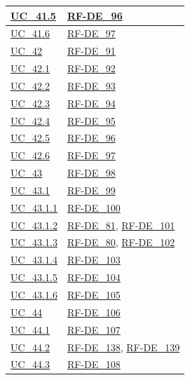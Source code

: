 \begin{longtable}{|
        >{\raggedright\arraybackslash}p{} |
        >{\raggedright\arraybackslash}p{} |
    }
    \hline
    \hyperref[uc_41.5]{UC\_41.5} & \hyperlink{rf-de_96}{RF-DE\_96} \\
    \hline
    \hyperref[uc_41.6]{UC\_41.6} & \hyperlink{rf-de_97}{RF-DE\_97} \\
    \hline
    \hyperref[uc_42]{UC\_42} & \hyperlink{rf-de_91}{RF-DE\_91} \\
    \hline
    \hyperref[uc_42.1]{UC\_42.1} & \hyperlink{rf-de_92}{RF-DE\_92} \\
    \hline
    \hyperref[uc_42.2]{UC\_42.2} & \hyperlink{rf-de_93}{RF-DE\_93} \\
    \hline
    \hyperref[uc_42.3]{UC\_42.3} & \hyperlink{rf-de_94}{RF-DE\_94} \\
    \hline
    \hyperref[uc_42.4]{UC\_42.4} & \hyperlink{rf-de_95}{RF-DE\_95} \\
    \hline
    \hyperref[uc_42.5]{UC\_42.5} & \hyperlink{rf-de_96}{RF-DE\_96} \\
    \hline
    \hyperref[uc_42.6]{UC\_42.6} & \hyperlink{rf-de_97}{RF-DE\_97} \\
    \hline
    \hyperref[uc_43]{UC\_43} & \hyperlink{rf-de_98}{RF-DE\_98} \\
    \hline
    \hyperref[uc_43.1]{UC\_43.1} & \hyperlink{rf-de_99}{RF-DE\_99} \\
    \hline
    \hyperref[uc_43.1.1]{UC\_43.1.1} & \hyperlink{rf-de_100}{RF-DE\_100} \\
    \hline
    \hyperref[uc_43.1.2]{UC\_43.1.2} & \hyperlink{rf-de_81}{RF-DE\_81}, \hyperlink{rf-de_101}{RF-DE\_101} \\
    \hline
    \hyperref[uc_43.1.3]{UC\_43.1.3} & \hyperlink{rf-de_80}{RF-DE\_80}, \hyperlink{rf-de_102}{RF-DE\_102} \\
    \hline
    \hyperref[uc_43.1.4]{UC\_43.1.4} & \hyperlink{rf-de_103}{RF-DE\_103} \\
    \hline
    \hyperref[uc_43.1.5]{UC\_43.1.5} & \hyperlink{rf-de_104}{RF-DE\_104} \\
    \hline
    \hyperref[uc_43.1.6]{UC\_43.1.6} & \hyperlink{rf-de_105}{RF-DE\_105} \\
    \hline
    \hyperref[uc_44]{UC\_44} & \hyperlink{rf-de_106}{RF-DE\_106} \\
    \hline
    \hyperref[uc_44.1]{UC\_44.1} & \hyperlink{rf-de_107}{RF-DE\_107} \\
    \hline
    \hyperref[uc_44.2]{UC\_44.2} & \hyperlink{rf-de_138}{RF-DE\_138}, \hyperlink{rf-de_139}{RF-DE\_139} \\
    \hline
    \hyperref[uc_44.3]{UC\_44.3} & \hyperlink{rf-de_108}{RF-DE\_108} \\

\end{longtable}

